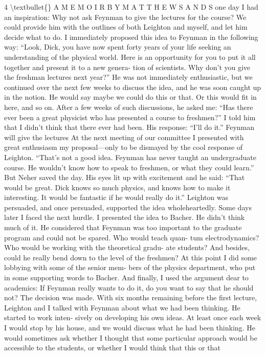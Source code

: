 \documentclass[10pt,oneside]{article}
\begin{document}
4 \textbackslash{}textbullet\{\} A  M E M O I R  B Y  M A T T H E W  S A N D S one day I had an inspiration: Why not ask Feynman to give the lectures for the course? We could provide him with the outlines of both Leighton and myself, and let him decide what to do. I immediately proposed this idea to Feynman in the following way: “Look, Dick, you have now spent forty years of your life seeking an understanding of the physical world. Here is an opportunity for you to put it all together and present it to a new genera- tion of scientists. Why don’t you give the freshman lectures next year?” He was not immediately enthusiastic, but we continued over the next few weeks to discuss the idea, and he was soon caught up in the notion. He would say maybe we could do this or that. Or this would fit in here, and so on. After a few weeks of such discussions, he asked me: “Has there ever been a great physicist who has presented a course to freshmen?” I told him that I didn’t think that there ever had been. His response: “I’ll do it.” Feynman will give the lectures At the next meeting of our committee I presented with great enthusiasm my proposal---only to be dismayed by the cool response of Leighton. “That’s not a good idea. Feynman has never taught an undergraduate course. He wouldn’t know how to speak to freshmen, or what they could learn.” But Neher saved the day. His eyes lit up with excitement and he said: “That would be great. Dick knows so much physics, and knows how to make it interesting. It would be fantastic if he would really do it.” Leighton was persuaded, and once persuaded, supported the idea wholeheartedly. Some days later I faced the next hurdle. I presented the idea to Bacher. He didn’t think much of it. He considered that Feynman was too important to the graduate program and could not be spared. Who would teach quan- tum electrodynamics? Who would be working with the theoretical gradu- ate students? And besides, could he really bend down to the level of the freshmen? At this point I did some lobbying with some of the senior mem- bers of the physics department, who put in some supporting words to Bacher. And finally, I used the argument dear to academics: If Feynman really wants to do it, do you want to say that he should not? The decision was made. With six months remaining before the first lecture, Leighton and I talked with Feynman about what we had been thinking. He started to work inten- sively on developing his own ideas. At least once each week I would stop by his house, and we would discuss what he had been thinking. He would sometimes ask whether I thought that some particular approach would be accessible to the students, or whether I would think that this or that\par
\end{document}
